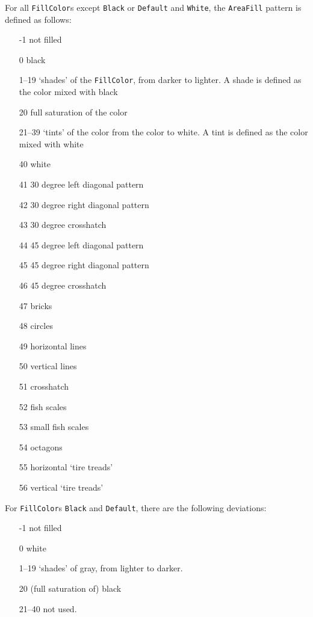 \documentclass[10pt, a4paper]{article}%
\begin{document}
For all \texttt{FillColor}s except \texttt{Black} or \texttt{Default} and \texttt{White}, 
the \texttt{AreaFill} pattern is defined as follows: 
%
\begin{enumerate}
\item[-1]    not filled
\item[0]     black
\item[1--19]  `shades' of the \texttt{FillColor}, from darker to lighter.
             A shade is defined as the color mixed with black
\item[20]    full saturation of the color
\item[21--39] `tints' of the color from the color to white.
             A tint is defined as the color mixed with white
\item[40]    white
\item[41]    30 degree left diagonal pattern
\item[42]    30 degree right diagonal pattern
\item[43]    30 degree crosshatch
\item[44]    45 degree left diagonal pattern
\item[45]    45 degree right diagonal pattern
\item[46]    45 degree crosshatch
\item[47]    bricks
\item[48]    circles
\item[49]    horizontal lines
\item[50]    vertical lines
\item[51]    crosshatch
\item[52]    fish scales
\item[53]    small fish scales
\item[54]    octagons
\item[55]    horizontal `tire treads'
\item[56]    vertical `tire treads'
\end{enumerate}

For \texttt{FillColor}s \texttt{Black} and \texttt{Default}, 
there are the following deviations: 
%
\begin{enumerate}
\item[-1]    not filled
\item[0]     white
\item[1--19]  `shades' of gray, from lighter to darker.
\item[20]    (full saturation of) black
\item[21--40] not used. 
\end{enumerate}
\end{document}
